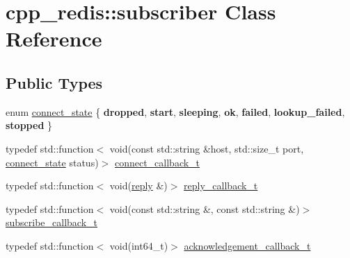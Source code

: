 \hypertarget{classcpp__redis_1_1subscriber}{}\section{cpp\+\_\+redis\+:\+:subscriber Class Reference}
\label{classcpp__redis_1_1subscriber}
\subsection*{Public Types}
\begin{DoxyCompactItemize}
\item 
enum \hyperlink{classcpp__redis_1_1subscriber_afc976757efd9d0ac4def6935546a2338}{connect\+\_\+state} \{ \newline
{\bfseries dropped}, 
{\bfseries start}, 
{\bfseries sleeping}, 
{\bfseries ok}, 
\newline
{\bfseries failed}, 
{\bfseries lookup\+\_\+failed}, 
{\bfseries stopped}
 \}
\item 
typedef std\+::function$<$ void(const std\+::string \&host, std\+::size\+\_\+t port, \hyperlink{classcpp__redis_1_1subscriber_afc976757efd9d0ac4def6935546a2338}{connect\+\_\+state} status)$>$ \hyperlink{classcpp__redis_1_1subscriber_a90f2f7d4c748c3c2e89d1e977fa6dce1}{connect\+\_\+callback\+\_\+t}
\item 
typedef std\+::function$<$ void(\hyperlink{classcpp__redis_1_1reply}{reply} \&)$>$ \hyperlink{classcpp__redis_1_1subscriber_a99d220cc662664e2399b709f61ac9581}{reply\+\_\+callback\+\_\+t}
\item 
typedef std\+::function$<$ void(const std\+::string \&, const std\+::string \&)$>$ \hyperlink{classcpp__redis_1_1subscriber_ac6ab8ebc526d784e4b79a39bbd73dca8}{subscribe\+\_\+callback\+\_\+t}
\item 
typedef std\+::function$<$ void(int64\+\_\+t)$>$ \hyperlink{classcpp__redis_1_1subscriber_a19ea39dfabeb19937a9ce4c8d21781b4}{acknowledgement\+\_\+callback\+\_\+t}
\end{DoxyCompactItemize}
